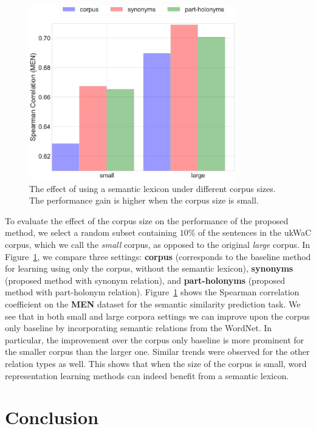 \documentclass[letterpaper]{article}
\begin{document}
\begin{figure}[t]
\centering
\includegraphics[width=90mm]{size.eps}
\caption{The effect of using a semantic lexicon under different corpus sizes. The performance gain is higher when the corpus size is small.}
\label{fig:size}
\end{figure}

To evaluate the effect of the corpus size on the performance of the proposed method, we select a random
subset containing $10\%$ of the sentences in the ukWaC corpus, which we call the \emph{small} corpus, as opposed to
the original \emph{large} corpus. In Figure~\ref{fig:size}, we compare three settings:
\textbf{corpus} (corresponds to the baseline method for learning using only the corpus, without the semantic lexicon),
\textbf{synonyms} (proposed method with synonym relation), and \textbf{part-holonyms} (proposed method with part-holonym
relation). Figure~\ref{fig:size} shows the Spearman correlation coefficient on the \textbf{MEN} dataset for the semantic similarity
prediction task. We see that in both small and large corpora settings we can improve upon the corpus only baseline
by incorporating semantic relations from the WordNet. In particular, the improvement over the corpus only baseline is
more prominent for the smaller corpus than the larger one. Similar trends were observed for the other relation types as well.
This shows that when the size of the corpus is small, word representation learning methods
can indeed benefit from a semantic lexicon.


\vspace{-3.33mm}
\section{Conclusion}
\end{document}
